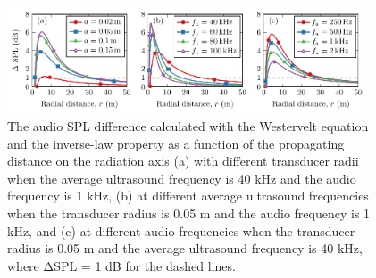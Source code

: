 \begin{figure}[h]
    \centering
    \includegraphics[width = 0.95\textwidth]{Figures/pending/farfield_200803A.pdf}
    \caption{The audio SPL difference calculated with the Westervelt equation and the inverse-law property as a function of the propagating distance on the radiation axis (a) with different transducer radii when the average ultrasound frequency is 40 kHz and the audio frequency is 1 kHz, (b) at different average ultrasound frequencies when the transducer radius is 0.05 m and the audio frequency is 1 kHz, and (c) at different audio frequencies when the transducer radius is 0.05 m and the average ultrasound frequency is 40 kHz, where ΔSPL = 1 dB for the dashed lines.}
    \label{fig:swe:farfield}
\end{figure}
